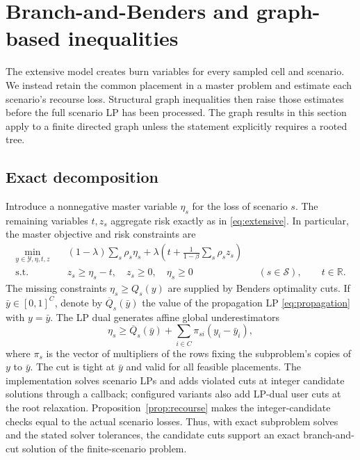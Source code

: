 \section{Branch-and-Benders and graph-based inequalities}
\label{sec:methods}

The extensive model creates burn variables for every sampled cell and
scenario. We instead retain the common placement in a master problem and
estimate each scenario's recourse loss. Structural graph inequalities then
raise those estimates before the full scenario LP has been processed.
The graph results in this section apply to a finite directed graph unless
the statement explicitly requires a rooted tree.

\subsection{Exact decomposition}\label{sec:benders}

Introduce a nonnegative master variable $\eta_s$ for the loss of scenario
$s$. The remaining variables $t,z_s$ aggregate risk exactly as in
\eqref{eq:extensive}. In particular, the master objective and risk
constraints are
\begin{equation}\label{eq:master}
 \begin{aligned}
 \min_{y\in\mathcal Y,\eta,t,z}\quad
 &(1-\lambda)\sum_s\rho_s\eta_s
   +\lambda\left(t+\frac{1}{1-\beta}\sum_s\rho_sz_s\right)\\
 \text{s.t.}\quad
 &z_s\ge\eta_s-t,\quad z_s\ge0,\quad\eta_s\ge0
       &&(s\in\mathcal S),\qquad t\in\mathbb R.
 \end{aligned}
\end{equation}
The missing constraints $\eta_s\ge Q_s(y)$ are supplied by Benders
optimality cuts. If $\bar y\in[0,1]^C$, denote by $\overline Q_s(\bar y)$
the value of the propagation LP \eqref{eq:propagation} with $y=\bar y$.
The LP dual generates affine global underestimators
\begin{equation}\label{eq:benders-cut}
 \eta_s\ge \overline Q_s(\bar y)
         +\sum_{i\in C}\pi_{si}(y_i-\bar y_i),
\end{equation}
where $\pi_s$ is the vector of multipliers of the rows fixing the
subproblem's copies of $y$ to $\bar y$. The cut is tight at $\bar y$ and
valid for all feasible placements. The implementation solves scenario LPs
and adds violated cuts at integer candidate solutions through a callback;
configured variants also add LP-dual user cuts at the root relaxation.
Proposition~\ref{prop:recourse} makes the integer-candidate checks equal
to the actual scenario losses. Thus, with exact subproblem solves and the
stated solver tolerances, the candidate cuts support an exact
branch-and-cut solution of the finite-scenario problem.

